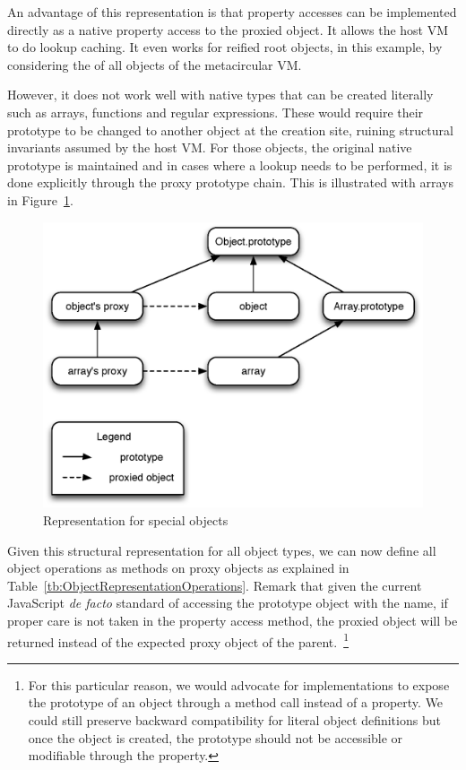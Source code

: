 An advantage of this representation is that property accesses can be
implemented directly as a native property access to the proxied object. It
allows the host VM to do lookup caching. It even works for reified root
objects, in this example, by considering  the 
of all objects of the metacircular VM.

However, it does not work well with native types that can be created literally
such as arrays, functions and regular expressions. These would require their
prototype to be changed to another object at the creation site, ruining
structural invariants assumed by the host VM. For those objects, the original
native prototype is maintained and in cases where a lookup needs to be
performed, it is done explicitly through the proxy prototype chain. This is
illustrated with arrays in Figure~\ref{fig:SpecialRepresentation}.

\begin{figure}[htb]
\begin{center}
\includegraphics[scale=0.75]{figures/specialRepresentation}
\caption{\label{fig:SpecialRepresentation} Representation for special objects}
\end{center}
\end{figure}

Given this structural representation for all object types, we can now define
all object operations as methods on proxy objects as explained in
Table~\ref{tb:ObjectRepresentationOperations}. Remark that given the current
JavaScript \textit{de facto} standard of accessing the prototype object with
the  name, if proper care is not taken in the property access
method, the proxied object will be returned instead of the expected proxy object of
the parent.~\footnote{For this particular reason, we would advocate for
implementations to expose the prototype of an object through a method call
instead of a property. We could still preserve backward compatibility for
literal object definitions but once the object is created, the prototype should
not be accessible or modifiable through the  property.}

